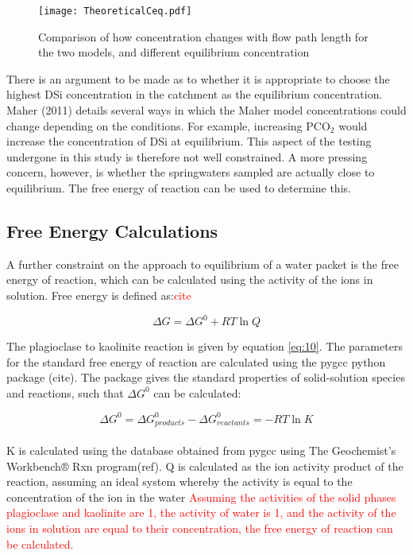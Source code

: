 \begin{figure}[h]
    \centering
    \texttt{[image: TheoreticalCeq.pdf]}
    \caption{Comparison of how concentration changes with flow path length for the two models, and different equilibrium concentration}
    \label{fig:discussion8}
\end{figure}

\FloatBarrier

There is an argument to be made as to whether it is appropriate to choose the highest DSi concentration in the catchment as the equilibrium concentration. Maher (2011) details several ways in which the Maher model concentrations could change depending on the conditions. For example, increasing PCO$_2$ would increase the concentration of DSi at equilibrium. This aspect of the testing undergone in this study is therefore not well constrained. A more pressing concern, however, is whether the springwaters sampled are actually close to equilibrium. The free energy of reaction can be used to determine this.

\subsection{Free Energy Calculations}

A further constraint on the approach to equilibrium of a water packet is the free energy of reaction, which can be calculated using the activity of the ions in solution. Free energy is defined as:\textcolor{red}{cite}

\begin{equation}
    \Delta G = \Delta G^0 + RT \ln Q
\end{equation}

The plagioclase to kaolinite reaction is given by equation \ref{eq:10}. The parameters for the standard free energy of reaction are calculated using the pygcc python package (cite). The package gives the standard properties of solid-solution species and reactions, such that $\Delta G^0$ can be calculated:

\begin{equation}
    \Delta G^0 = \Delta G^0_{products} - \Delta G^0_{reactants} = -RT \ln K
\end{equation}\\
K is calculated using the database obtained from pygcc using The Geochemist's Workbench® Rxn program(ref). Q is calculated as the ion activity product of the reaction, assuming an ideal system whereby the activity is equal to the concentration of the ion in the water \textcolor{red}{Assuming the activities of the solid phases plagioclase and kaolinite are 1, the activity of water is 1, and the activity of the ions in solution are equal to their concentration, the free energy of reaction can be calculated. }

